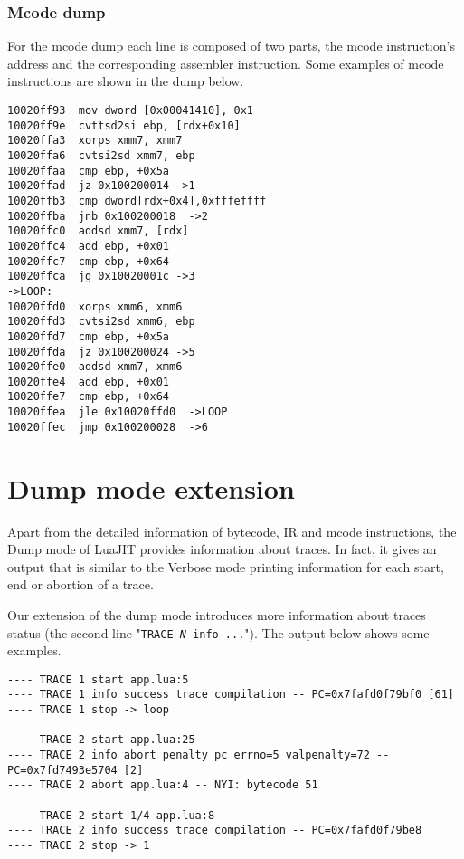 
\subsubsection{Mcode dump}

For the mcode dump each line is composed of two parts, the mcode instruction's address and the corresponding assembler instruction. Some examples of mcode instructions are shown in the dump below.

\begin{multicols}{2}
\begin{lstlisting}
10020ff93  mov dword [0x00041410], 0x1
10020ff9e  cvttsd2si ebp, [rdx+0x10]
10020ffa3  xorps xmm7, xmm7
10020ffa6  cvtsi2sd xmm7, ebp
10020ffaa  cmp ebp, +0x5a
10020ffad  jz 0x100200014 ->1
10020ffb3  cmp dword[rdx+0x4],0xfffeffff
10020ffba  jnb 0x100200018  ->2
10020ffc0  addsd xmm7, [rdx]
10020ffc4  add ebp, +0x01
10020ffc7  cmp ebp, +0x64
10020ffca  jg 0x10020001c ->3
->LOOP:
10020ffd0  xorps xmm6, xmm6
10020ffd3  cvtsi2sd xmm6, ebp
10020ffd7  cmp ebp, +0x5a
10020ffda  jz 0x100200024 ->5
10020ffe0  addsd xmm7, xmm6
10020ffe4  add ebp, +0x01
10020ffe7  cmp ebp, +0x64
10020ffea  jle 0x10020ffd0  ->LOOP
10020ffec  jmp 0x100200028  ->6
\end{lstlisting}
\end{multicols}


\section{Dump mode extension}
\label{sec:dump-extension}
Apart from the detailed information of bytecode, IR and mcode instructions, the Dump mode of LuaJIT provides information about traces. In fact, it gives an output that is similar to the Verbose mode printing information for each start, end or abortion of a trace. 

Our extension of the dump mode introduces more information about traces status (the second line "\texttt{TRACE \textit{N} info ...}"). The output below shows some examples.
\begin{lstlisting}[style=CommandsLuaJIT]
---- TRACE 1 start app.lua:5
---- TRACE 1 info success trace compilation -- PC=0x7fafd0f79bf0 [61]
---- TRACE 1 stop -> loop

---- TRACE 2 start app.lua:25  
---- TRACE 2 info abort penalty pc errno=5 valpenalty=72 -- PC=0x7fd7493e5704 [2]
---- TRACE 2 abort app.lua:4 -- NYI: bytecode 51

---- TRACE 2 start 1/4 app.lua:8
---- TRACE 2 info success trace compilation -- PC=0x7fafd0f79be8
---- TRACE 2 stop -> 1
\end{lstlisting}

